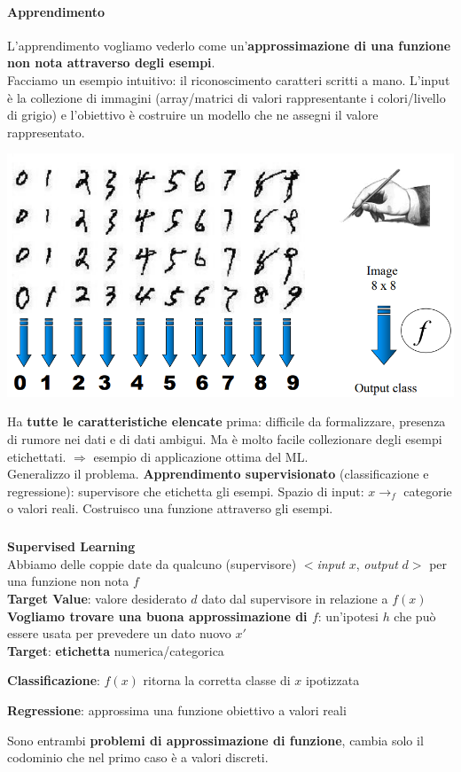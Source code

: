 \documentclass[10pt]{book}
\begin{document}
\paragraph{Apprendimento} L'apprendimento vogliamo vederlo come un'\textbf{approssimazione di una funzione non nota attraverso degli esempi}.\\
Facciamo un esempio intuitivo: il riconoscimento caratteri scritti a mano. L'input è la collezione di immagini (array/matrici di valori rappresentante i colori/livello di grigio) e l'obiettivo è costruire un modello che ne assegni il valore rappresentato.
\begin{center}
	\includegraphics[scale=0.55]{ml2.png}
\end{center}
Ha \textbf{tutte le caratteristiche elencate} prima: difficile da formalizzare, presenza di rumore nei dati e di dati ambigui. Ma è molto facile collezionare degli esempi etichettati. $\Rightarrow$ esempio di applicazione ottima del ML.\\
Generalizzo il problema. \textbf{Apprendimento supervisionato} (classificazione e regressione): supervisore che etichetta gli esempi. Spazio di input: $x \rightarrow_f$ categorie o valori reali. Costruisco una funzione attraverso gli esempi.
\pagebreak
\subparagraph{}\textbf{Supervised Learning}\\
Abbiamo delle coppie date da qualcuno (supervisore) $<$\textit{input} $x$, \textit{output} $d>$ per una funzione non nota $f$\\
\textbf{Target Value}: valore desiderato $d$ dato dal supervisore in relazione a $f(x)$\\
\textbf{Vogliamo trovare una buona approssimazione di $f$}: un'ipotesi $h$ che può essere usata per prevedere un dato nuovo $x'$\\
\textbf{Target}: \textbf{etichetta} numerica/categorica
\begin{list}{}{}
	\item \textbf{Classificazione}: $f(x)$ ritorna la corretta classe di $x$ ipotizzata
	\item \textbf{Regressione}: approssima una funzione obiettivo a valori reali
\end{list}
Sono entrambi \textbf{problemi di approssimazione di funzione}, cambia solo il codominio che nel primo caso è a valori discreti.
\end{document}
